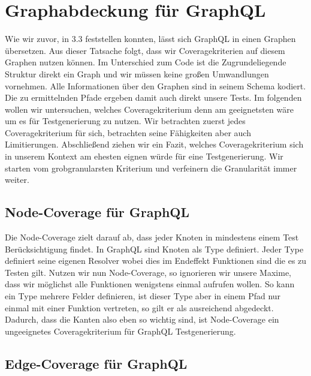 \chapter{Graphabdeckung für GraphQL}


Wie wir zuvor, in $3.3$ feststellen konnten, lässt sich GraphQL in einen Graphen übersetzen.
Aus dieser Tatsache folgt, dass wir Coveragekriterien auf diesem Graphen nutzen können.
Im Unterschied zum Code ist die Zugrundeliegende Struktur direkt ein Graph und wir müssen keine großen Umwandlungen vornehmen.
Alle Informationen über den Graphen sind in seinem Schema kodiert.
Die zu ermittelnden Pfade ergeben damit auch direkt unsere Tests.
Im folgenden wollen wir untersuchen, welches Coveragekriterium denn am geeignetsten wäre um es
für Testgenerierung zu nutzen.
Wir betrachten zuerst jedes Coveragekriterium für sich, betrachten seine Fähigkeiten aber auch Limitierungen.
Abschließend ziehen wir ein Fazit, welches Coveragekriterium sich in unserem Kontext am ehesten eignen würde für
eine Testgenerierung.
Wir starten vom grobgranularsten Kriterium und verfeinern die Granularität immer weiter.

\section{Node-Coverage für GraphQL}

Die Node-Coverage zielt darauf ab, dass jeder Knoten in mindestens einem Test Berücksichtigung findet.
In GraphQL sind Knoten als Type definiert.
Jeder Type definiert seine eigenen Resolver wobei dies im Endeffekt Funktionen sind die es zu Testen gilt.
Nutzen wir nun Node-Coverage, so ignorieren wir unsere Maxime, dass wir möglichst alle Funktionen wenigstens einmal aufrufen wollen.
So kann ein Type mehrere Felder definieren, ist dieser Type aber in einem Pfad nur einmal mit einer Funktion vertreten, so gilt er als ausreichend abgedeckt.
Dadurch, dass die Kanten also eben so wichtig sind, ist Node-Coverage ein ungeeignetes Coveragekriterium für GraphQL Testgenerierung.

\section{Edge-Coverage für GraphQL}

